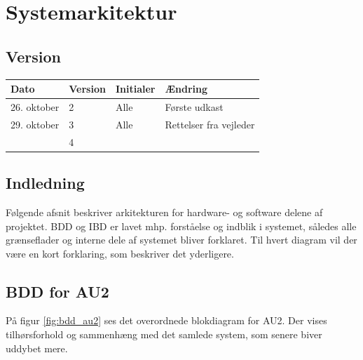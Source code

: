 \chapter{Systemarkitektur}

\section*{Version}
\begin{table}[h]
	\centering
	\begin{tabularx}{\textwidth - 2cm}{|l|l|l|X|}
	\hline
	Dato			& Version			& Initialer 		& Ændring										\\ \hline
	26. oktober		& 2 				& Alle				& Første udkast	\\ \hline
	29. oktober		& 3 				& Alle 				& Rettelser fra vejleder \\ \hline
					& 4 				&  					& 												\\ \hline
	\end{tabularx}
\end{table}

\section{Indledning}
Følgende afsnit beskriver arkitekturen for hardware- og software delene af projektet. BDD og IBD er lavet mhp. forståelse og indblik i systemet, således alle grænseflader og interne dele af systemet bliver forklaret. Til hvert diagram vil der være en kort forklaring, som beskriver det yderligere.

\section{BDD for AU2}	%

På figur \ref{fig:bdd_au2} ses det overordnede blokdiagram for AU2. Der vises tilhørsforhold og sammenhæng med det samlede system, som senere biver uddybet mere.

